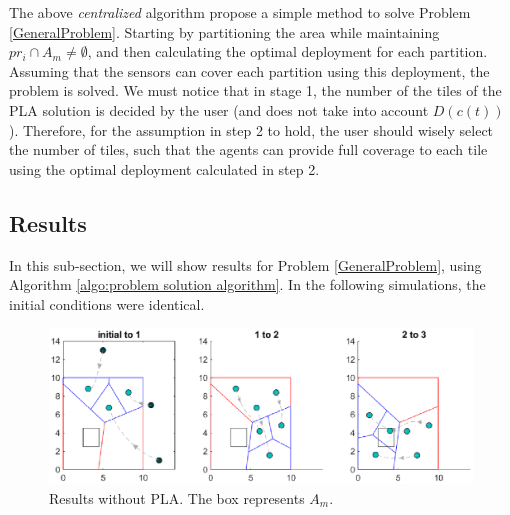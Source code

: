 \documentclass{iacas}
\begin{document}
The above \emph{centralized} algorithm propose a simple method to solve Problem \ref{GeneralProblem}. Starting by partitioning the area while maintaining $pr_i \cap A_m \neq \emptyset$, and then calculating the optimal deployment for each partition. Assuming that the sensors can cover each partition using this deployment, the problem is solved. 
We must notice that in stage 1, the number of the tiles of the PLA solution is decided by the user (and does not take into account $D(c(t))$). Therefore, for the assumption in step 2 to hold, the user should wisely select the number of tiles, such that the agents can provide full coverage to each tile using the optimal deployment calculated in step 2.%


\subsection{Results}
In this sub-section, we will show results for Problem \ref{GeneralProblem}, using Algorithm \ref{algo:problem solution algorithm}.
%
In the following simulations, the initial conditions were identical.

\begin{figure}[H]
\includegraphics[scale=0.8]{figures/proposed-sol/results/sim1-3agents-3partitions-noPLA.eps}
\caption{Results without PLA. The box represents $A_m$.}
\label{fig:results no PLA}
\end{figure}
\end{document}
